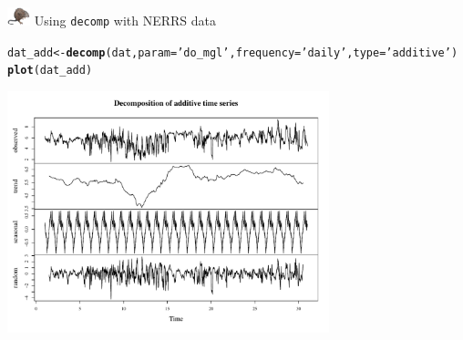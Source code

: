 \documentclass[xcolor=dvipsnames,serif]{beamer}\usepackage[]{graphicx}\usepackage[]{color}
\makeatletter
\newcommand{\hlstr}[1]{\textcolor[rgb]{0.192,0.494,0.8}{#1}}%
\newcommand{\hlstd}[1]{\textcolor[rgb]{0.345,0.345,0.345}{#1}}%
\newcommand{\hlkwb}[1]{\textcolor[rgb]{0.69,0.353,0.396}{#1}}%
\newcommand{\hlkwc}[1]{\textcolor[rgb]{0.333,0.667,0.333}{#1}}%
\newcommand{\hlkwd}[1]{\textcolor[rgb]{0.737,0.353,0.396}{\textbf{#1}}}%
\newenvironment{kframe}{%
 \def\at@end@of@kframe{}%
 \ifinner\ifhmode%
  \def\at@end@of@kframe{\end{minipage}}%
  \begin{minipage}{\columnwidth}%
 \fi\fi%
 \def\FrameCommand##1{\hskip\@totalleftmargin \hskip-\fboxsep
 \colorbox{shadecolor}{##1}\hskip-\fboxsep
     \hskip-\linewidth \hskip-\@totalleftmargin \hskip\columnwidth}%
 \MakeFramed {\advance\hsize-\width
   \@totalleftmargin\z@ \linewidth\hsize
   \@setminipage}}%
 {\par\unskip\endMakeFramed%
 \at@end@of@kframe}
\newenvironment{knitrout}{}{} %
\makeatother
\begin{document}
\begin{frame}[fragile]{\includegraphics[width = 0.05\textwidth]{imgs/swmprat.png} Using \texttt{decomp} with NERRS data}
\begin{knitrout}\scriptsize
{}\color{fgcolor}\begin{kframe}
\begin{alltt}
\hlstd{dat_add} \hlkwb{<-} \hlkwd{decomp}\hlstd{(dat,} \hlkwc{param} \hlstd{=} \hlstr{'do_mgl'}\hlstd{,} \hlkwc{frequency} \hlstd{=} \hlstr{'daily'}\hlstd{,} \hlkwc{type} \hlstd{=} \hlstr{'additive'}\hlstd{)}
\hlkwd{plot}\hlstd{(dat_add)}
\end{alltt}
\end{kframe}

{\centering \includegraphics[width=0.7\textwidth]{imgs/dailydcadd-1} 

}



\end{knitrout}
\end{frame}
\end{document}

